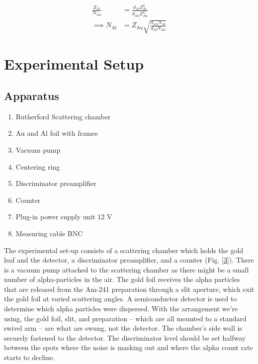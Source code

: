 \begin{align} \label{eq:part2}
    \frac{Z_\text{Al}}{N_\text{Au}} &= \frac{d_\text{Al}Z^2_\text{Al}}{d_\text{Au}Z^2_\text{Au}} \nonumber\\
    \implies N_\text{Al} &= Z_\text{Au}\sqrt{\frac{d_\text{Au}N_\text{Al}}{d_\text{Al}N_\text{Au}}}
\end{align}

\section{Experimental Setup}

\subsection*{Apparatus}

\begin{enumerate}
    \item Rutherford Scattering chamber
    \item Au and Al foil with frames
    \item Vacuum pump
    \item Centering ring
    \item Discriminator preamplifier
    \item Counter
    \item Plug-in power supply unit 12 V
    \item Measuring cable BNC\\
\end{enumerate}

The experimental set-up consists of a scattering chamber
which holds the gold leaf and the detector, a discriminator
preamplifier, and a counter (Fig. \ref{3}). There is a vacuum pump attached to the scattering chamber as there might be a small number of alpha-particles in the air. The gold foil receives the alpha particles that are released from the Am-241 preparation through a slit
aperture, which exit the gold foil at varied scattering angles. A semiconductor detector is used to determine which alpha particles were
dispersed. With the arrangement we’re using, the gold
foil, slit, and preparation -- which are all mounted to a
standard swivel arm -- are what are swung, not the detector. The chamber’s side wall is securely fastened to the
detector. The discriminator level should be set halfway
between the spots where the noise is masking out and
where the alpha count rate starts to decline.

